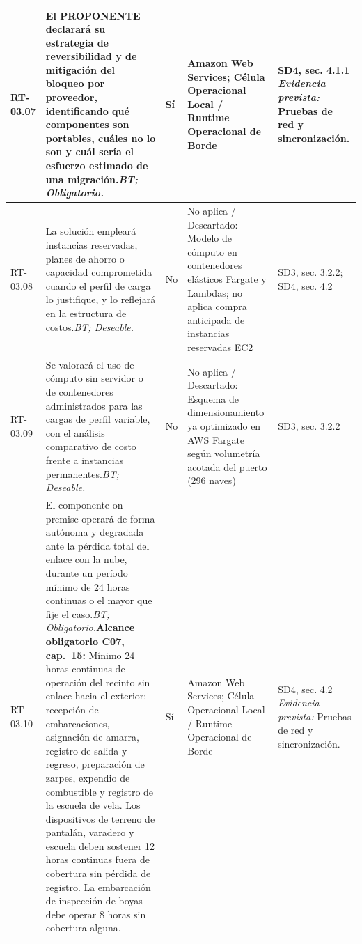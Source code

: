\begin{paginaHorizontalSynaptix}
\begin{longtable}{|L{0.09\AnchoMatrizTDoce}|L{0.385\AnchoMatrizTDoce}|L{0.065\AnchoMatrizTDoce}|L{0.18\AnchoMatrizTDoce}|L{0.28\AnchoMatrizTDoce}|}
RT-\allowbreak{}03.\allowbreak{}07 &
El PROPONENTE declarará su estrategia de reversibilidad y de mitigación del bloqueo por proveedor, identificando qué componentes son portables, cuáles no lo son y cuál sería el esfuerzo estimado de una migración.\newline\textit{BT; Obligatorio.} &
Sí &
Amazon Web Services; Célula Operacional Local / Runtime Operacional de Borde &
SD4, sec. 4.1.1 \newline\textit{Evidencia prevista:} Pruebas de red y sincronización. \\ \hline

RT-\allowbreak{}03.\allowbreak{}08 &
La solución empleará instancias reservadas, planes de ahorro o capacidad comprometida cuando el perfil de carga lo justifique, y lo reflejará en la estructura de costos.\newline\textit{BT; Deseable.} &
No &
No aplica / Descartado: Modelo de cómputo en contenedores elásticos Fargate y Lambdas; no aplica compra anticipada de instancias reservadas EC2 &
SD3, sec. 3.2.2; SD4, sec. 4.2 \\ \hline

RT-\allowbreak{}03.\allowbreak{}09 &
Se valorará el uso de cómputo sin servidor o de contenedores administrados para las cargas de perfil variable, con el análisis comparativo de costo frente a instancias permanentes.\newline\textit{BT; Deseable.} &
No &
No aplica / Descartado: Esquema de dimensionamiento ya optimizado en AWS Fargate según volumetría acotada del puerto (296 naves) &
SD3, sec. 3.2.2 \\ \hline

RT-\allowbreak{}03.\allowbreak{}10 &
El componente on-premise operará de forma autónoma y degradada ante la pérdida total del enlace con la nube, durante un período mínimo de 24 horas continuas o el mayor que fije el caso.\newline\textit{BT; Obligatorio.}\newline\textbf{Alcance obligatorio C07, cap.~15:} Mínimo 24 horas continuas de operación del recinto sin enlace hacia el exterior: recepción de embarcaciones, asignación de amarra, registro de salida y regreso, preparación de zarpes, expendio de combustible y registro de la escuela de vela. Los dispositivos de terreno de pantalán, varadero y escuela deben sostener 12 horas continuas fuera de cobertura sin pérdida de registro. La embarcación de inspección de boyas debe operar 8 horas sin cobertura alguna. &
Sí &
Amazon Web Services; Célula Operacional Local / Runtime Operacional de Borde &
SD4, sec. 4.2 \newline\textit{Evidencia prevista:} Pruebas de red y sincronización. \\ \hline


\end{longtable}
\end{paginaHorizontalSynaptix}
